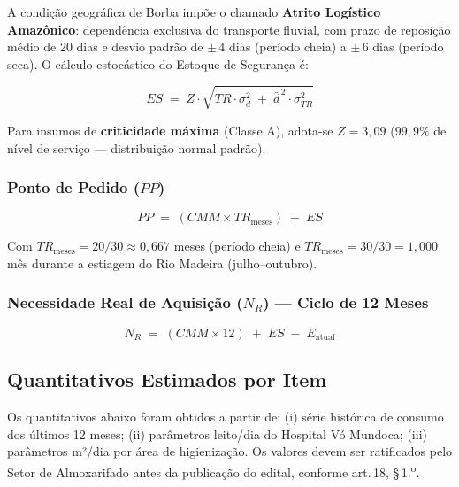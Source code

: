 \documentclass[12pt,a4paper]{article}
\newcommand{\art}[1]{art.\,#1}
\begin{document}
A condição geográfica de Borba impõe o chamado \textbf{Atrito Logístico Amazônico}:
dependência exclusiva do transporte fluvial, com prazo de reposição médio de 20 dias e
desvio padrão de $\pm\,4$ dias (período cheia) a $\pm\,6$ dias (período seca). O
cálculo estocástico do Estoque de Segurança é:

\begin{formulabox}
\[
  ES \;=\; Z \cdot \sqrt{TR \cdot \sigma_d^2 \;+\; \bar{d}^{\,2} \cdot \sigma_{TR}^2}
\]
\end{formulabox}

\noindent Para insumos de \textbf{criticidade máxima} (Classe A), adota-se
$Z = 3{,}09$ ($99{,}9\%$ de nível de serviço --- distribuição normal padrão).

\subsubsection{Ponto de Pedido ($PP$)}

\begin{formulabox}
\[
  PP \;=\; \left(CMM \times TR_{\text{meses}}\right) \;+\; ES
\]
\end{formulabox}

\noindent Com $TR_{\text{meses}} = 20/30 \approx 0{,}667$ meses (período cheia) e
$TR_{\text{meses}} = 30/30 = 1{,}000$ mês durante a estiagem do Rio Madeira
(julho--outubro).

\subsubsection{Necessidade Real de Aquisição ($N_R$) --- Ciclo de 12 Meses}

\begin{formulabox}
\[
  N_R \;=\; (CMM \times 12) \;+\; ES \;-\; E_{\text{atual}}
\]
\end{formulabox}

\subsection{Quantitativos Estimados por Item}

\begin{alertbox}
\small
Os quantitativos abaixo foram obtidos a partir de: (i) série histórica de consumo dos
últimos 12 meses; (ii) parâmetros leito/dia do Hospital Vó Mundoca; (iii) parâmetros
m²/dia por área de higienização. Os valores devem ser ratificados pelo Setor de
Almoxarifado antes da publicação do edital, conforme \art{18}, \S\,1.\textsuperscript{o}.
\end{alertbox}
\end{document}
